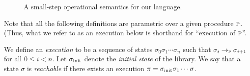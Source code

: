 \begin{figure}
\begin{mathpar}








\end{mathpar}
\caption{A small-step operational semantics for our language.}
\label{fig:semantics}
\end{figure}

Note that all the following definitions are parametric over a given procedure $\proc$.
(Thus, what we refer to as an execution below is shorthand for ``execution of $\proc$''.

We define an \emph{execution} to be a sequence of states $\sigma_0 \sigma_1 \cdots \sigma_n$ such that
$\sigma_i \sssem{\proc} \sigma_{i+1}$ for all $0 \leq i < n$.
Let $\initstate$ denote the \emph{initial state} of the library.
We say that a state $\sigma$ is \emph{ reachable} if there exists an execution $\pi = \initstate \sigma_1 \cdots \sigma$.

